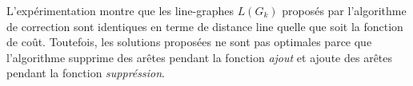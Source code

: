 L'exp\'erimentation montre que les line-graphes $L(G_k)$ propos\'es par l'algorithme de correction sont identiques  en terme de distance line quelle que soit la fonction de co\^ut. Toutefois, les solutions propos\'ees ne sont pas optimales parce que l'algorithme supprime des ar\^etes pendant la fonction {\em ajout} et ajoute des ar\^etes pendant la fonction {\em suppr\'ession}.  
